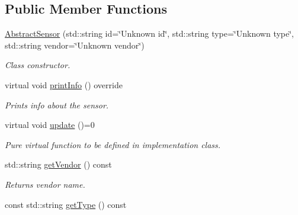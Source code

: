 \subsection*{Public Member Functions}
\begin{DoxyCompactItemize}
\item 
\hyperlink{classAbstractSensor_a6ce9232e9b428879bcdee6591eba55e6}{Abstract\+Sensor} (std\+::string id=\char`\"{}Unknown id\char`\"{}, std\+::string type=\char`\"{}Unknown type\char`\"{}, std\+::string vendor=\char`\"{}Unknown vendor\char`\"{})
\begin{DoxyCompactList}\small\item\em Class constructor. \end{DoxyCompactList}\item 
virtual void \hyperlink{classAbstractSensor_a3257c4d460a482098f65bd7059b0b29a}{print\+Info} () override\hypertarget{classAbstractSensor_a3257c4d460a482098f65bd7059b0b29a}{}\label{classAbstractSensor_a3257c4d460a482098f65bd7059b0b29a}

\begin{DoxyCompactList}\small\item\em Prints info about the sensor. \end{DoxyCompactList}\item 
virtual void \hyperlink{classAbstractSensor_a8d0a1908c6aaf67fc7d781e54b49293b}{update} ()=0\hypertarget{classAbstractSensor_a8d0a1908c6aaf67fc7d781e54b49293b}{}\label{classAbstractSensor_a8d0a1908c6aaf67fc7d781e54b49293b}

\begin{DoxyCompactList}\small\item\em Pure virtual function to be defined in implementation class. \end{DoxyCompactList}\item 
std\+::string \hyperlink{classAbstractSensor_a2786a5387ea8a90f8451cb3a64a3e152}{get\+Vendor} () const \hypertarget{classAbstractSensor_a2786a5387ea8a90f8451cb3a64a3e152}{}\label{classAbstractSensor_a2786a5387ea8a90f8451cb3a64a3e152}

\begin{DoxyCompactList}\small\item\em Returns vendor name. \end{DoxyCompactList}\item 
const std\+::string \hyperlink{classAbstractSensor_a31f55a2259b24f124b64a3ddd3004d6e}{get\+Type} () const \hypertarget{classAbstractSensor_a31f55a2259b24f124b64a3ddd3004d6e}{}\label{classAbstractSensor_a31f55a2259b24f124b64a3ddd3004d6e}


\end{DoxyCompactItemize}
